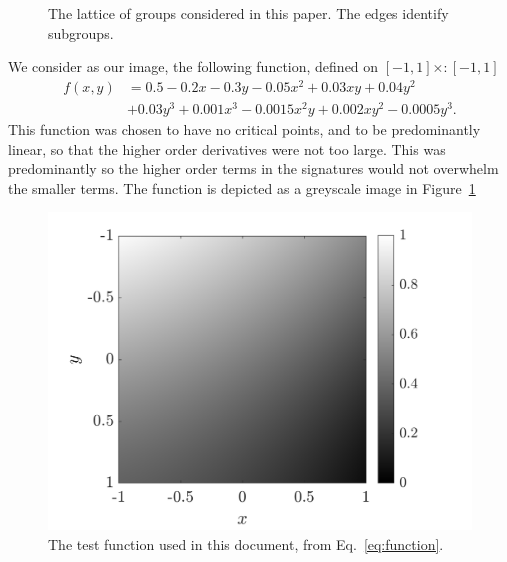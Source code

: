 \documentclass[review,onefignum,onetabnum]{siamonline190516}
\begin{document}
{\begin{figure}
\begin{center}
\end{center}
\caption{The lattice of groups considered in this paper. The edges identify subgroups.}
\end{figure}



We consider as our image, the following function, defined on $[-1, 1]
\times:
[-1, 1]$
\begin{equation}\label{eq:function}
  \begin{split}
    f(x, y) &= 0.5 - 0.2x - 0.3y - 0.05x^2 + 0.03xy + 0.04y^2 \\ 
    &+ 0.03y^3 + 0.001x^3 - 0.0015x^2y + 0.002xy^2 - 0.0005y^3.
  \end{split}
\end{equation}
This function was chosen to have no critical points, and to be
predominantly linear, so that the higher order derivatives were not too
large. This was predominantly so the higher order terms in the signatures
would not overwhelm the smaller terms. The function is depicted as a
greyscale image in Figure~\ref{fig:function}
\begin{figure}
  \centering
  \includegraphics[width=12cm]{Figs/function}
  \caption{The test function used in this document, from
  Eq.~\eqref{eq:function}.}\label{fig:function}
\end{figure}

}
\end{document}
